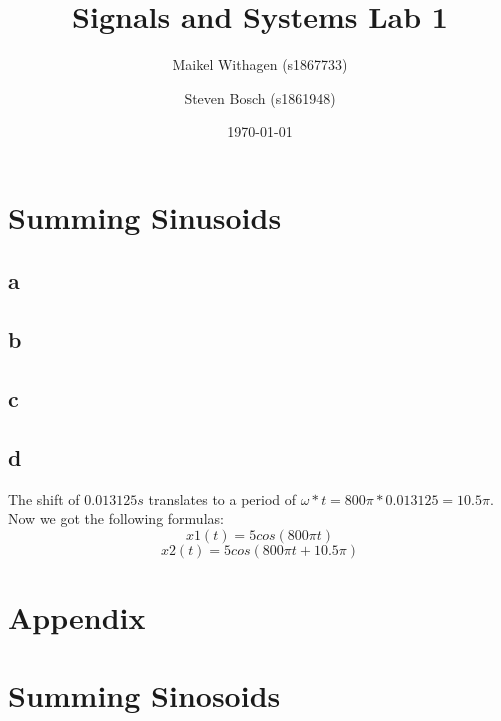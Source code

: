 \documentclass[10pt]{article}
\title{Signals and Systems Lab 1}
\author{Maikel Withagen (s1867733) \and Steven Bosch (s1861948)}
\date{\today}
\begin{document}
\maketitle

\section{Summing Sinusoids}
\subsection{a}
\subsection{b}
\subsection{c}
\subsection{d}
The shift of $0.013125s$ translates to a period of $\omega * t = 800\pi*0.013125 = 10.5\pi$.
Now we got the following formulas:
\begin{equation}
    x1(t) = 5 cos(800\pi t)
\end{equation}
\begin{equation}
    x2(t) = 5 cos(800\pi t + 10.5\pi)
\end{equation}


\newpage
\section*{Appendix}
\appendix
\section{Summing Sinosoids}
\end{document}
